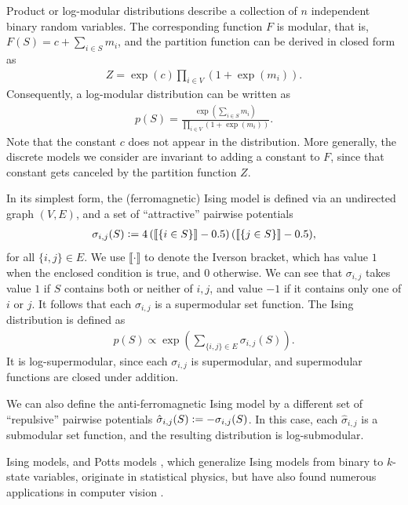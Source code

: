 \begin{example}
Product or log-modular distributions describe a collection of $n$ independent binary random variables.
The corresponding function $F$ is modular, that is, $F(S) = c + \sum_{i \in S} m_i$, and the partition function can be derived in closed form as
\begin{align*}
Z = \exp(c) \prod_{i \in V} \left( 1 + \exp(m_i) \right).
\end{align*}
Consequently, a log-modular distribution can be written as
\begin{align*}
  p(S) = \frac{\exp\left( \displaystyle\sum_{i \in S} m_i \right)}{\displaystyle\prod_{i \in V} \left( 1 + \exp(m_i) \right)}.
\end{align*}
Note that the constant $c$ does not appear in the distribution.
More generally, the discrete models we consider are invariant to adding a constant to $F$, since that constant gets canceled by the partition function $Z$.
\end{example}

\begin{example}
In its simplest form, the (ferromagnetic) Ising model \citep{ising} is defined via an undirected graph $(V, E)$, and a set of ``attractive'' pairwise potentials
\begin{align*}
\sigma_{i,j}(S) \vcentcolon= 4\left(\llbracket\{i \in S\}\rrbracket - 0.5\right)(\llbracket\{j \in S\}\rrbracket - 0.5),
\end{align*}
for all $\{i, j\} \in E$.
We use $\llbracket \cdot \rrbracket$ to denote the Iverson bracket, which has value $1$ when the enclosed condition is true, and $0$ otherwise.
We can see that $\sigma_{i,j}$ takes value $1$ if $S$ contains both or neither of $i, j$, and value $-1$ if it contains only one of $i$ or $j$.
It follows that each $\sigma_{i, j}$ is a supermodular set function.
The Ising distribution is defined as
\begin{align*}
p(S) \propto \exp\left(\sum_{\{i,j\} \in E} \sigma_{i,j}(S)\right).
\end{align*}
It is log-supermodular, since each $\sigma_{i,j}$ is supermodular, and supermodular functions are closed under addition.

We can also define the anti-ferromagnetic Ising model by a different set of ``repulsive'' pairwise potentials $\hat{\sigma}_{i,j}(S) \vcentcolon= -\sigma_{i,j}(S)$.
In this case, each $\hat{\sigma}_{i,j}$ is a submodular set function, and the resulting distribution is log-submodular.

Ising models, and Potts models \citep{potts}, which generalize Ising models from binary to $k$-state variables, originate in statistical physics, but have also found numerous applications in computer vision \citep{wang13}.
\end{example}

